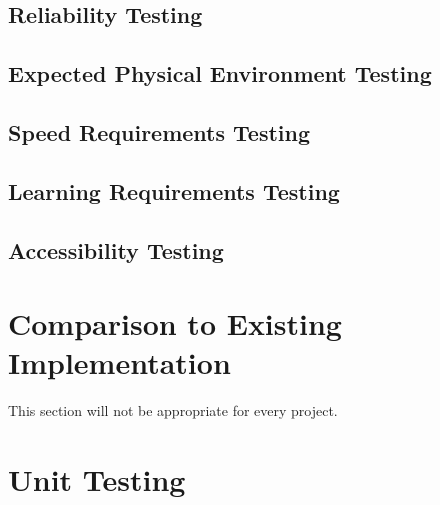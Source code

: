 \documentclass[12pt, titlepage]{article}
\begin{document}
\subsection{Reliability Testing}

\subsection{Expected Physical Environment Testing}

\subsection{Speed Requirements Testing}

\subsection{Learning Requirements Testing}

\subsection{Accessibility Testing}
	
\section{Comparison to Existing Implementation}	

This section will not be appropriate for every project.

\section{Unit Testing}
\end{document}
